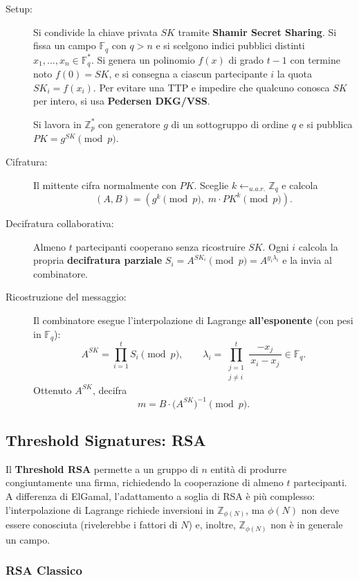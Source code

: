 \documentclass[a4paper, 11pt]{article}
\begin{document}
\begin{description}
    \item[Setup:] Si condivide la chiave privata $SK$ tramite \textbf{Shamir Secret Sharing}. Si fissa un campo $\mathbb{F}_q$ con $q>n$ e si scelgono indici pubblici distinti $x_1,\dots,x_n\in\mathbb{F}_q^*$. Si genera un polinomio $f(x)$ di grado $t-1$ con termine noto $f(0)=SK$, e si consegna a ciascun partecipante $i$ la quota $SK_i=f(x_i)$. Per evitare una TTP e impedire che qualcuno conosca $SK$ per intero, si usa \textbf{Pedersen DKG/VSS}.
        
        Si lavora in $\mathbb{Z}_p^*$ con generatore $g$ di un sottogruppo di ordine $q$ e si pubblica $PK=g^{SK}\pmod{p}$.
    \item[Cifratura:] Il mittente cifra normalmente con $PK$. Sceglie $k\gets_{u.a.r.}\mathbb{Z}_q$ e calcola
    \[
        (A,B)=(g^k \pmod{p},\; m\cdot PK^k \pmod{p}).
    \]
    \item[Decifratura collaborativa:] Almeno $t$ partecipanti cooperano senza ricostruire $SK$. Ogni $i$ calcola la propria \textbf{decifratura parziale} $S_i=A^{SK_i}\pmod{p} = A^{y_i\lambda_i}$ e la invia al combinatore.
    \item[Ricostruzione del messaggio:] Il combinatore esegue l'interpolazione di Lagrange \textbf{all'esponente} (con pesi in $\mathbb{F}_q$):
        \[
            A^{SK}=\prod_{i=1}^{t} S_i\pmod{p},
            \qquad
            \lambda_i=\prod_{\substack{j=1\\ j\neq i}}^{t}\frac{-x_j}{\,x_i-x_j\,}\in\mathbb{F}_q.
        \]
        Ottenuto $A^{SK}$, decifra
        \[
            m=B\cdot \bigl(A^{SK}\bigr)^{-1}\pmod{p}.
        \]
\end{description}

\subsection{Threshold Signatures: RSA}

Il \textbf{Threshold RSA} permette a un gruppo di $n$ entità di produrre congiuntamente una firma, richiedendo la cooperazione di almeno $t$ partecipanti. A differenza di ElGamal, l'adattamento a soglia di RSA è più complesso: l'interpolazione di Lagrange richiede inversioni in $\mathbb{Z}_{\phi(N)}$, ma $\phi(N)$ non deve essere conosciuta (rivelerebbe i fattori di $N$) e, inoltre, $\mathbb{Z}_{\phi(N)}$ non è in generale un campo.

\subsubsection{RSA Classico}
\end{document}
